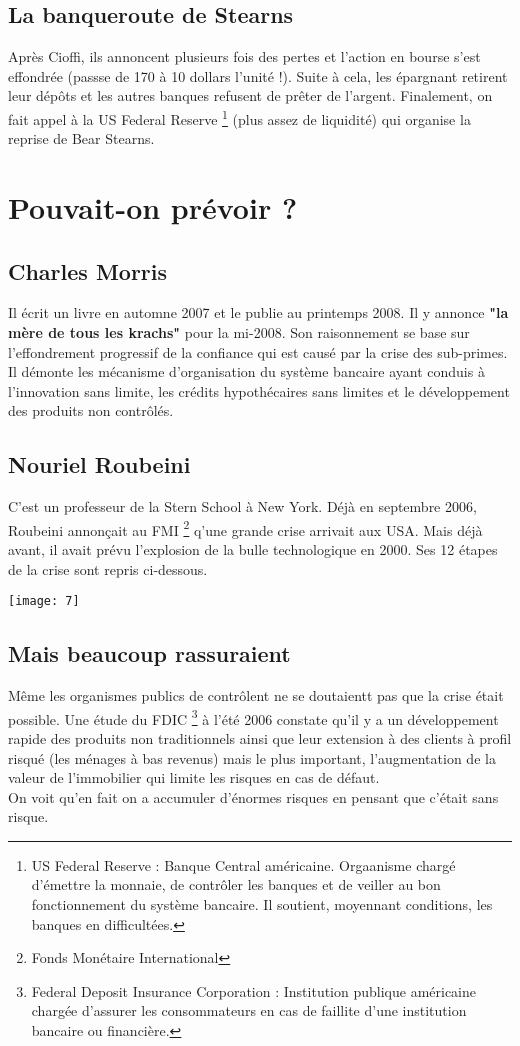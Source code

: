\subsection{La banqueroute de Stearns}
Après Cioffi, ils annoncent plusieurs fois des pertes et l'action en bourse s'est effondrée (passse de 170 à 10 dollars l'unité !). Suite à cela, les épargnant retirent leur dépôts et les autres banques refusent de prêter de l'argent. Finalement, on fait appel à la US Federal Reserve \footnote{US Federal Reserve : Banque Central américaine. Orgaanisme chargé d'émettre la monnaie, de contrôler les banques et de veiller au bon fonctionnement du système bancaire. Il soutient, moyennant conditions, les banques en difficultées.} (plus assez de liquidité) qui organise la reprise de Bear Stearns.

\section{Pouvait-on prévoir ?}
\subsection{Charles Morris}
Il écrit un livre en automne 2007 et le publie au printemps 2008. Il y annonce \textbf{"la mère de tous les krachs"} pour la mi-2008. Son raisonnement se base sur l'effondrement progressif de la confiance qui est causé par la crise des sub-primes. Il démonte les mécanisme d'organisation du système bancaire ayant conduis à l'innovation sans limite, les crédits hypothécaires sans limites et le développement des produits non contrôlés.

\subsection{Nouriel Roubeini}
C'est un professeur de la Stern School à New York. Déjà en septembre 2006, Roubeini annonçait au FMI \footnote{Fonds Monétaire International} q'une grande crise arrivait aux USA. Mais déjà avant, il avait prévu l'explosion de la bulle technologique en 2000. Ses 12 étapes de la crise sont repris ci-dessous.  
\begin{center}
	\texttt{[image: 7]}
\end{center}

\subsection{Mais beaucoup rassuraient}
Même les organismes publics de contrôlent ne se doutaientt pas que la crise était possible. Une étude du FDIC \footnote{Federal Deposit Insurance Corporation : Institution publique américaine chargée d'assurer les consommateurs en cas de faillite d'une institution bancaire ou financière.} à l'été 2006 constate qu'il y a un développement rapide des produits non traditionnels ainsi que leur extension à des clients à profil risqué (les ménages à bas revenus) mais le plus important, l'augmentation de la valeur de l'immobilier qui limite les risques en cas de défaut. \\
On voit qu'en fait on a accumuler d'énormes risques en pensant que c'était sans risque.

